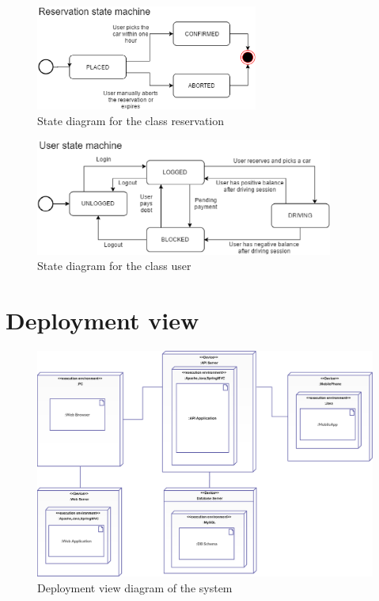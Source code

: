 \begin{figure}[h]
	\centering
	\includegraphics[width=7.3cm,keepaspectratio]{figures/reservation_state_diagram.eps}
	\caption{State diagram for the class reservation}
	\label{fig:reservation_state_diagram}
\end{figure}

\begin{figure}[h]
	\centering
	\includegraphics[width=9.8cm,keepaspectratio]{figures/user_state_diagram.eps}
	\caption{State diagram for the class user}
	\label{fig:user_state_diagram}
\end{figure}

\clearpage
\section{Deployment view}
\begin{figure}[h]
	\centering
	\includegraphics[width=\linewidth,keepaspectratio]{figures/deployment_view.eps}
	\caption{Deployment view diagram of the system}
	\label{fig:deployment_view}
\end{figure}

